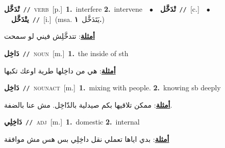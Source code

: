 \documentclass[10pt,a4paper,twoside]{article} %
\begin{document}
\begin{multicols}{2}
{\setlength\topsep{0pt}\textbf{\foreignlanguage{arabic}{تْدَخَّل}}\ {\color{gray}\texttt{//}\color{black}}\ \textsc{verb}\ [p.]\ \textbf{1.}~interfere  \textbf{2.}~intervene\ \ $\bullet$\ \ \setlength\topsep{0pt}\textbf{\foreignlanguage{arabic}{تْدَخَّل}}\ {\color{gray}\texttt{//}\color{black}}\ [c.]\ \ $\bullet$\ \ \setlength\topsep{0pt}\textbf{\foreignlanguage{arabic}{يتْدَخَّل}}\ {\color{gray}\texttt{//}\color{black}}\ [i.]\ \color{gray}(msa. \foreignlanguage{arabic}{يَتَدَخَّل}~\foreignlanguage{arabic}{\textbf{١.}})\color{black}\  \begin{flushright}\color{gray}\foreignlanguage{arabic}{\textbf{\underline{\foreignlanguage{arabic}{أمثلة}}}: تتدخَّلِش فيني لو سمحت}\end{flushright}\color{black}} \vspace{2mm}

{\setlength\topsep{0pt}\textbf{\foreignlanguage{arabic}{دَاخِل}}\ {\color{gray}\texttt{//}\color{black}}\ \textsc{noun}\ [m.]\ \textbf{1.}~the inside of sth\  \begin{flushright}\color{gray}\foreignlanguage{arabic}{\textbf{\underline{\foreignlanguage{arabic}{أمثلة}}}: هي من داخِلها طرية اوعك تكبها}\end{flushright}\color{black}} \vspace{2mm}

{\setlength\topsep{0pt}\textbf{\foreignlanguage{arabic}{دَاخِل}}\ {\color{gray}\texttt{//}\color{black}}\ \textsc{noun\textunderscore act}\ [m.]\ \textbf{1.}~mixing with people.  \textbf{2.}~knowing sb deeply\  \begin{flushright}\color{gray}\foreignlanguage{arabic}{\textbf{\underline{\foreignlanguage{arabic}{أمثلة}}}: ممكن تلاقيها بكم صيدلية بالدّاخِل. مش عنا بالضفة.}\end{flushright}\color{black}} \vspace{2mm}

{\setlength\topsep{0pt}\textbf{\foreignlanguage{arabic}{دَاخِلِي}}\ {\color{gray}\texttt{//}\color{black}}\ \textsc{adj}\ [m.]\ \textbf{1.}~domestic  \textbf{2.}~internal\  \begin{flushright}\color{gray}\foreignlanguage{arabic}{\textbf{\underline{\foreignlanguage{arabic}{أمثلة}}}: بدي اياها تعملي نقل داخِلِي بس هس مش موافقة}\end{flushright}\color{black}} \vspace{2mm}


\end{multicols}
\end{document}
